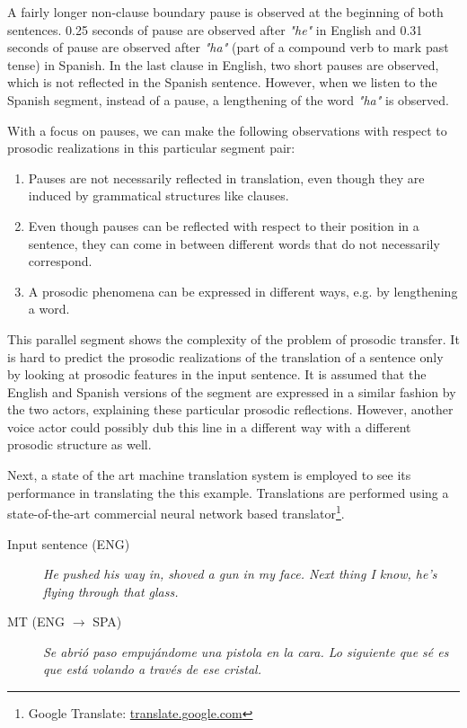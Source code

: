 A fairly longer non-clause boundary pause is observed at the beginning of both sentences. 0.25 seconds of pause are observed after \textit{"he"} in English and 0.31 seconds of pause are observed after \textit{"ha"} (part of a compound verb to mark past tense) in Spanish. In the last clause in English, two short pauses are observed, which is not reflected in the Spanish sentence. However, when we listen to the Spanish segment, instead of a pause, a lengthening of the word \textit{"ha"} is observed. 

With a focus on pauses, we can make the following observations with respect to prosodic realizations in this particular segment pair:
\begin{enumerate}
    \item Pauses are not necessarily reflected in translation, even though they are induced by grammatical structures like clauses.
    \item Even though pauses can be reflected with respect to their position in a sentence, they can come in between different words that do not necessarily correspond. 
    \item A prosodic phenomena can be expressed in different ways, e.g. by lengthening a word. 
\end{enumerate}

This parallel segment shows the complexity of the problem of prosodic transfer. It is hard to predict the prosodic realizations of the translation of a sentence only by looking at prosodic features in the input sentence. It is assumed that the English and Spanish versions of the segment are expressed in a similar fashion by the two actors, explaining these particular prosodic reflections. However, another voice actor could possibly dub this line in a different way with a different prosodic structure as well.  

Next, a state of the art machine translation system is employed to see its performance in translating the this example. Translations are performed using a state-of-the-art commercial neural network based translator\footnote{Google Translate: \url{translate.google.com}}.  

\begin{description}
\item [Input sentence (ENG)] {\it He pushed his way in, shoved a gun in my face. Next thing I know, he's flying through that glass.}
\item [MT (ENG $\rightarrow$ SPA)] {\it Se abrió paso empujándome una pistola en la cara. Lo siguiente que sé es que está volando a través de ese cristal.}
\end{description}

